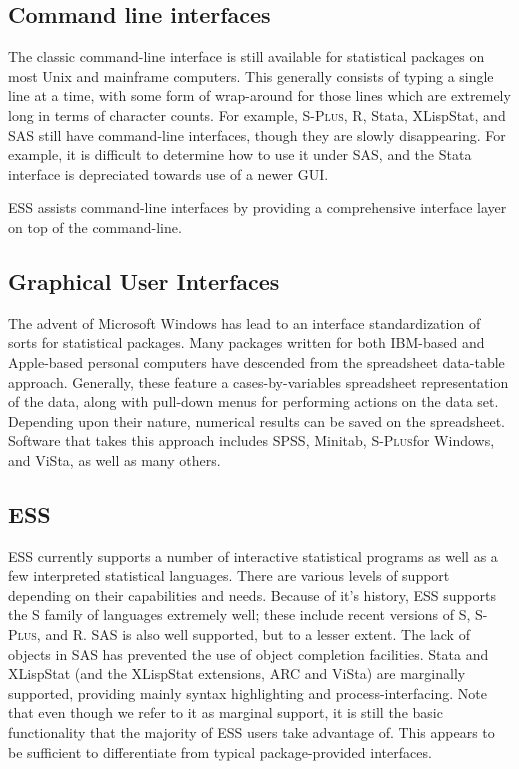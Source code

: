 \documentclass{article}
\newcommand*{\Splus}{\textsc{S-Plus}}
\begin{document}
\subsection{Command line interfaces}
\label{sec:UI:command}

The classic command-line interface is still available for statistical
packages on most Unix and mainframe computers.  This generally
consists of typing a single line at a time, with some form of
wrap-around for those lines which are extremely long in terms of
character counts.  For example, \Splus, R, Stata, XLispStat, and SAS
still have command-line interfaces, though they are slowly
disappearing.  For example, it is difficult to determine how to use
it under SAS, and the Stata interface is depreciated towards use of a
newer GUI.

ESS assists command-line interfaces by providing a comprehensive
interface layer on top of the command-line.

\subsection{Graphical User Interfaces}
\label{sec:UI:GUI}

The advent of Microsoft Windows has lead to an interface
standardization of sorts for statistical packages.  Many packages
written for both IBM-based and Apple-based personal computers have
descended from the spreadsheet data-table approach.  Generally, these
feature a cases-by-variables spreadsheet representation of the data,
along with pull-down menus for performing actions on the data set.
Depending upon their nature, numerical results can be saved on the
spreadsheet.  Software that takes this approach includes SPSS,
Minitab, \Splus for Windows, and ViSta, as well as many others.  

\subsection{ESS}
\label{sec:UI:ESS}


ESS currently supports a number of interactive statistical programs as
well as a few interpreted statistical languages.  There are various
levels of support depending on their capabilities and needs.  Because
of it's history, ESS supports the S family of languages extremely
well; these include recent versions of S, \Splus, and R.  SAS is also
well supported, but to a lesser extent.  The lack of objects in SAS
has prevented the use of object completion facilities.  Stata and
XLispStat (and the XLispStat extensions, ARC and ViSta) are marginally
supported, providing mainly syntax highlighting and
process-interfacing.  Note that even though we refer to it as marginal
support, it is still the basic functionality that the majority of ESS
users take advantage of.  This appears to be sufficient to
differentiate from typical package-provided interfaces.
\end{document}
